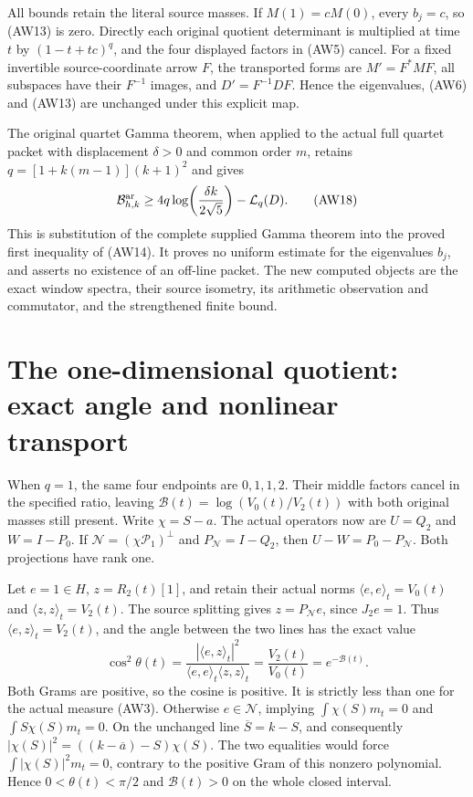 \documentclass[11pt,a4paper]{article}
\newcommand{\cP}{\mathcal P}
\begin{document}
All bounds retain the literal source masses. If $M(1)=cM(0)$,
every $b_j=c$, so (AW13) is zero. Directly each original
quotient determinant is multiplied at time $t$ by
$(1-t+tc)^q$, and the four displayed factors in (AW5) cancel.
For a fixed invertible source-coordinate arrow $F$, the transported
forms are $M'=F^*MF$, all subspaces have their $F^{-1}$ images,
and $D'=F^{-1}DF$. Hence the eigenvalues, (AW6) and (AW13)
are unchanged under this explicit map.

The original quartet Gamma theorem, when applied to the actual
full quartet packet with displacement $\delta>0$ and common
order $m$, retains $q=[1+k(m-1)](k+1)^2$ and gives
\[
 \mathcal B^{\rm ar}_{h,k}
 \ge4q\log\!\left(\frac{\delta k}{2\sqrt5}\right)
             -\mathcal L_q(D).
 \tag{AW18}
\]
This is substitution of the complete supplied Gamma theorem
into the proved first inequality of (AW14). It proves no
uniform estimate for the eigenvalues $b_j$, and asserts no
existence of an off-line packet. The new computed objects are
the exact window spectra, their source isometry, its arithmetic
observation and commutator, and the strengthened finite bound.

\section{The one-dimensional quotient: exact angle and nonlinear transport}

When $q=1$, the same four endpoints are $0,1,1,2$. Their
middle factors cancel in the specified ratio, leaving
$\mathcal B(t)=\log(V_0(t)/V_2(t))$ with both original masses
still present. Write $\chi=S-a$. The actual operators now are
$U=Q_2$ and $W=I-P_0$. If $\mathcal N=(\chi\cP_1)^\perp$
and $P_{\mathcal N}=I-Q_2$, then
$U-W=P_0-P_{\mathcal N}$. Both projections have rank one.

Let $e=1\in H$, $z=R_2(t)[1]$, and retain their actual norms
$\langle e,e\rangle_t=V_0(t)$ and
$\langle z,z\rangle_t=V_2(t)$. The source splitting gives
$z=P_{\mathcal N}e$, since $J_2e=1$. Thus
$\langle e,z\rangle_t=V_2(t)$, and the angle between the
two lines has the exact value
\[
 \cos^2\theta(t)=\frac{|\langle e,z\rangle_t|^2}
                         {\langle e,e\rangle_t\langle z,z\rangle_t}
       =\frac{V_2(t)}{V_0(t)}=e^{-\mathcal B(t)}.
 \tag{AW19}
\]
Both Grams are positive, so the cosine is positive. It is
strictly less than one for the actual measure (AW3).
Otherwise $e\in\mathcal N$, implying
$\int\chi(S)m_t=0$ and $\int S\chi(S)m_t=0$.
On the unchanged line $\overline S=k-S$, and consequently
$|\chi(S)|^2=((k-\overline a)-S)\chi(S)$.
The two equalities would force $\int|\chi(S)|^2m_t=0$,
contrary to the positive Gram of this nonzero polynomial.
Hence $0<\theta(t)<\pi/2$ and $\mathcal B(t)>0$ on the
whole closed interval.
\end{document}
